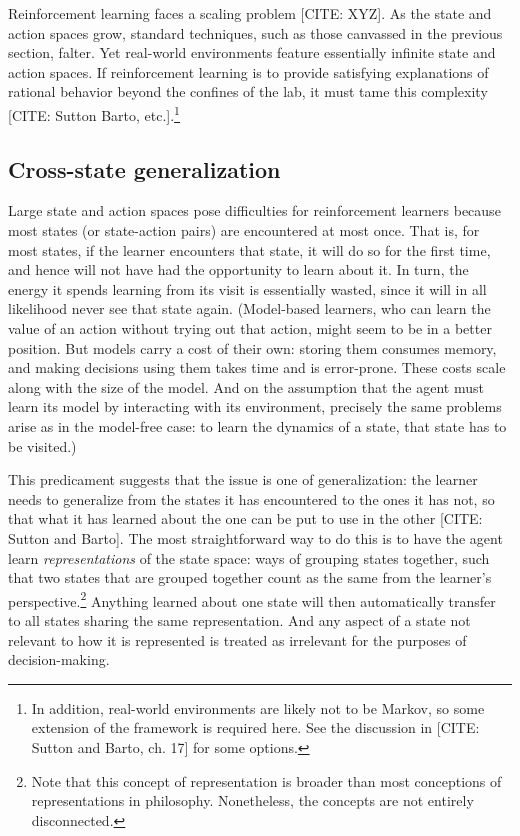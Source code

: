 \documentclass{article}
\begin{document}
	
Reinforcement learning faces a scaling problem [CITE: XYZ].
As the state and action spaces grow, standard techniques, such as those canvassed in the previous section, falter.
Yet real-world environments feature essentially infinite state and action spaces.
If reinforcement learning is to provide satisfying explanations of rational behavior beyond the confines of the lab, it must tame this complexity [CITE: Sutton Barto, etc.].\footnote{In addition, real-world environments are likely not to be Markov, so some extension of the framework is required here.
See the discussion in [CITE: Sutton and Barto, ch. 17] for some options.}

\subsection{Cross-state generalization}

Large state and action spaces pose difficulties for reinforcement learners because most states (or state-action pairs) are encountered at most once.
That is, for most states, if the learner encounters that state, it will do so for the first time, and hence will not have had the opportunity to learn about it.
In turn, the energy it spends learning from its visit is essentially wasted, since it will in all likelihood never see that state again.
(Model-based learners, who can learn the value of an action without trying out that action, might seem to be in a better position.
But models carry a cost of their own: storing them consumes memory, and making decisions using them takes time and is error-prone.
These costs scale along with the size of the model.
And on the assumption that the agent must learn its model by interacting with its environment, precisely the same problems arise as in the model-free case: to learn the dynamics of a state, that state has to be visited.)

This predicament suggests that the issue is one of generalization: the learner needs to generalize from the states it has encountered to the ones it has not, so that what it has learned about the one can be put to use in the other [CITE: Sutton and Barto].
The most straightforward way to do this is to have the agent learn \emph{representations} of the state space: ways of grouping states together, such that two states that are grouped together count as the same from the learner's perspective.\footnote{Note that this concept of representation is broader than most conceptions of representations in philosophy. Nonetheless, the concepts are not entirely disconnected.}
Anything learned about one state will then automatically transfer to all states sharing the same representation.
And any aspect of a state not relevant to how it is represented is treated as irrelevant for the purposes of decision-making.
\end{document}
